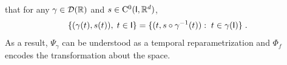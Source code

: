 
        

    \begin{remark}
      that for any $\gamma \in \mathcal{D}(\mathbb{R}) $ and $s\in \mathrm{C}^0(\mathsf{I},\mathbb{R}^d)$,
   \begin{equation}
    \{(\gamma(t),s(t)),\; t\in \mathsf{I} \}=\{(t,s\circ \gamma^{-1}(t)):\; t\in\gamma(\mathsf{I}) \}\; .
   \end{equation}
   As a result, $\Psi_\gamma $ can be understood as a temporal reparametrization and $\Phi_f$ encodes the transformation about the space.
 \end{remark}


